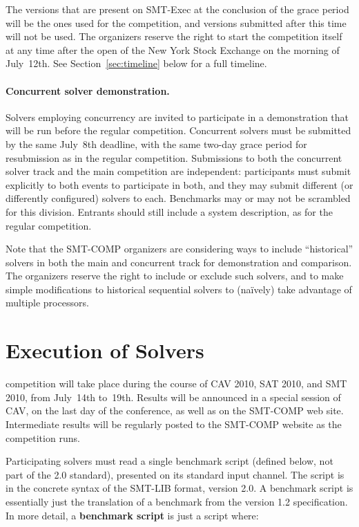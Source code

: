 \documentclass[12pt]{article}
\begin{document}
The versions that are present on SMT-Exec at the conclusion of the
grace period will be the ones used for the competition, and versions
submitted after this time will not be used.  The organizers reserve
the right to start the competition itself at any time after the open
of the New York Stock Exchange on the morning of July~12th.  See
Section~\ref{sec:timeline} below for a full timeline.

\paragraph{Concurrent solver demonstration.} %
Solvers employing concurrency are invited to participate in a
demonstration that will be run before the regular competition.
Concurrent solvers must be submitted by the same July~8th deadline,
with the same two-day grace period for resubmission as in the regular
competition.  Submissions to both the concurrent solver track
and the main competition are independent: participants must submit
explicitly to both events to participate in both, and they may submit
different (or differently configured) solvers to each.  Benchmarks may
or may not be scrambled for this division.  Entrants should still
include a system description, as for the regular competition.

\medskip
\noindent
Note that the SMT-COMP organizers are considering ways to include
``historical'' solvers in both the main and concurrent track for
demonstration and comparison.  The organizers reserve the right to
include or exclude such solvers, and to make simple modifications
to historical sequential solvers to (na\"ively) take advantage of
multiple processors.

\section{Execution of Solvers}
\label{sec:exec}

competition will take place during the course of CAV 2010, SAT 2010,
and SMT 2010, from July~14th to~19th.  Results will be announced in a
special session of CAV, on the last day of the conference, as well as
on the SMT-COMP web site.  Intermediate results will be regularly
posted to the SMT-COMP website as the competition runs.

Participating solvers must read a single benchmark script (defined
below, not part of the 2.0 standard), presented on its standard input
channel.  The script is in the concrete syntax of the SMT-LIB format,
version 2.0.  A benchmark script is essentially just the translation
of a benchmark from the version 1.2 specification.  In more detail, a
\textbf{benchmark script} is just a script where:
\end{document}
